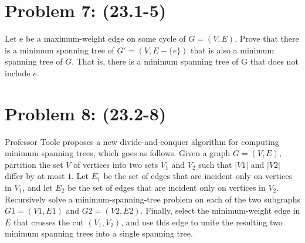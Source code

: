 \documentclass[a4paper]{article}
\begin{document}
\section{Problem 7: (23.1-5)} Let e be a maximum-weight edge on some cycle of $G = (V, E)$. Prove that there is a minimum spanning tree of $G′ = (V, E -\{e\})$ that is also a minimum spanning tree of $G$. That is, there is a minimum spanning tree of G that does not include $e$.
 
\section{Problem 8: (23.2-8)} Professor Toole proposes a new divide-and-conquer algorithm for computing minimum spanning trees, which goes as follows. Given a graph $G = (V, E)$, partition the set $V$ of vertices into two sets $V_1$ and $V_2$ such that $|V1|$ and $|V2|$ differ by at most $1$. Let $E_1$ be the set of edges that are incident only on vertices in $V_1$, and let $E_2$ be the set of edges that are incident only on vertices in $V_2$. Recursively solve a minimum-spanning-tree problem on each of the two subgraphs $G1 = (V1, E1)$ and $G2 = (V2, E2)$. Finally, select the minimum-weight edge in $E$ that crosses the cut $(V_1, V_2)$, and use this edge to unite the resulting two minimum spanning
trees into a single spanning tree.
\end{document}
